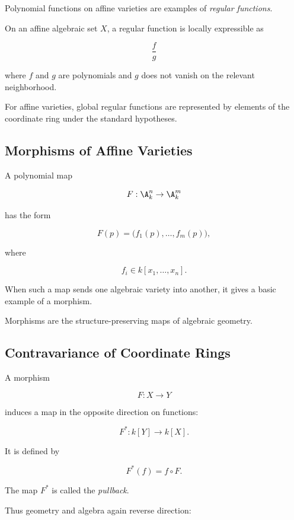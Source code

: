 Polynomial functions on affine varieties are examples of
\emph{regular functions}.

On an affine algebraic set \(X\), a regular function is locally expressible
as

\[
\boxed{
\frac{f}{g}
}
\]

where \(f\) and \(g\) are polynomials and \(g\) does not vanish on the
relevant neighborhood.

For affine varieties, global regular functions are represented by elements
of the coordinate ring under the standard hypotheses.

\subsection{Morphisms of Affine Varieties}
\label{subsec:morphisms-affine-varieties}

A polynomial map

\[
F:\A^n_k\to\A^m_k
\]

has the form

\[
\boxed{
F(p)
=
\bigl(
f_1(p),\ldots,f_m(p)
\bigr),
}
\]

where

\[
f_i\in k[x_1,\ldots,x_n].
\]

When such a map sends one algebraic variety into another, it gives a basic
example of a morphism.

Morphisms are the structure-preserving maps of algebraic geometry.

\subsection{Contravariance of Coordinate Rings}
\label{subsec:contravariance-coordinate-rings}

A morphism

\[
F:X\to Y
\]

induces a map in the opposite direction on functions:

\[
\boxed{
F^*:k[Y]\to k[X].
}
\]

It is defined by

\[
\boxed{
F^*(f)=f\circ F.
}
\]

The map \(F^*\) is called the \emph{pullback}.

Thus geometry and algebra again reverse direction:

